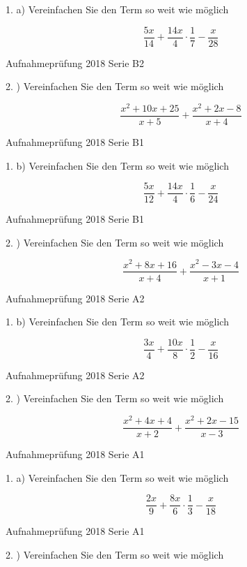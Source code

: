 1. a) Vereinfachen Sie den Term so weit wie möglich

$$\frac{5x}{14} + \frac{14x}4 \cdot{} \frac17 - \frac{x}{28}$$

Aufnahmeprüfung 2018 Serie B2

2. ) Vereinfachen Sie den Term so weit wie möglich

$$\frac{x^2+10x+25}{x+5} + \frac{x^2+2x-8}{x+4}$$

Aufnahmeprüfung 2018 Serie B1

1. b) Vereinfachen Sie den Term so weit wie möglich

$$\frac{5x}{12} + \frac{14x}{4} \cdot{} \frac16 - \frac{x}{24}$$

Aufnahmeprüfung 2018 Serie B1

2. ) Vereinfachen Sie den Term so weit wie möglich

$$\frac{x^2+8x+16}{x+4} + \frac{x^2-3x-4}{x+1}$$

Aufnahmeprüfung 2018 Serie A2

1. b) Vereinfachen Sie den Term so weit wie möglich

$$\frac{3x}4 + \frac{10x}8 \cdot{} \frac12 - \frac{x}{16}$$

Aufnahmeprüfung 2018 Serie A2

2. ) Vereinfachen Sie den Term so weit wie möglich

$$\frac{x^2+4x+4}{x+2} + \frac{x^2+2x-15}{x-3}$$

Aufnahmeprüfung 2018 Serie A1

1. a) Vereinfachen Sie den Term so weit wie möglich

$$\frac{2x}9 + \frac{8x}6 \cdot{} \frac13 - \frac{x}{18}$$

Aufnahmeprüfung 2018 Serie A1

2. ) Vereinfachen Sie den Term so weit wie möglich

